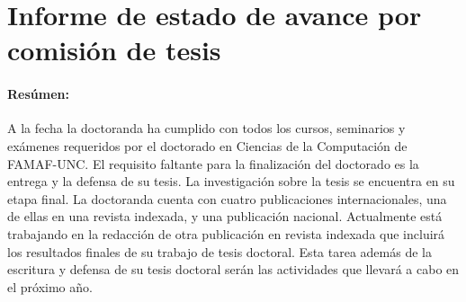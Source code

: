 \documentclass[a4paper,12pt]{article}
\begin{document}
\renewcommand{\refname}{Bibliograf\'ia}
%
%
%
%
%
%
%
%
%
%
%
%
%
%

\section*{Informe de estado de avance por comisi\'on de tesis}

\paragraph{Res\'umen:} A la fecha la doctoranda ha cumplido con todos los cursos, seminarios y ex\'amenes requeridos por el doctorado en Ciencias de la Computaci\'on de FAMAF-UNC. El requisito faltante para la finalizaci\'on del doctorado es la entrega y la defensa de su tesis. La investigaci\'on sobre la tesis se encuentra en su etapa final. La doctoranda cuenta con cuatro publicaciones internacionales, una de ellas en una revista indexada, y una publicaci\'on nacional. Actualmente est\'a trabajando en la redacci\'on de otra publicaci\'on en revista indexada que incluir\'a los resultados finales de su trabajo de tesis doctoral. Esta tarea adem\'as de la escritura y defensa de su tesis doctoral ser\'an las actividades que llevar\'a a cabo en el pr\'oximo a\~no. 
\end{document}

